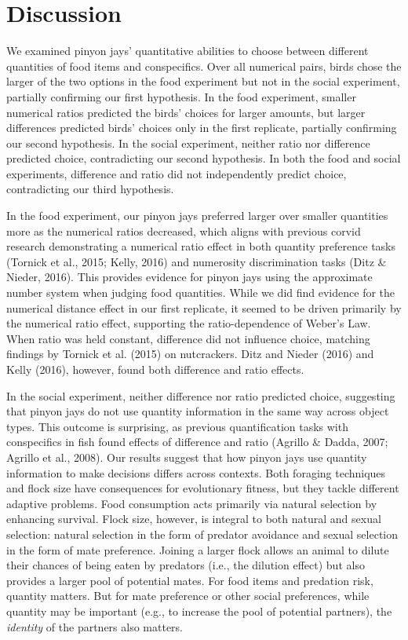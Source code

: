 \documentclass[
  ,pub,floatsintext]{apa6}
\begin{document}
\hypertarget{discussion}{%
\section{Discussion}\label{discussion}}

We examined pinyon jays' quantitative abilities to choose between different quantities of food items and conspecifics. Over all numerical pairs, birds chose the larger of the two options in the food experiment but not in the social experiment, partially confirming our first hypothesis. In the food experiment, smaller numerical ratios predicted the birds' choices for larger amounts, but larger differences predicted birds' choices only in the first replicate, partially confirming our second hypothesis. In the social experiment, neither ratio nor difference predicted choice, contradicting our second hypothesis. In both the food and social experiments, difference and ratio did not independently predict choice, contradicting our third hypothesis.

In the food experiment, our pinyon jays preferred larger over smaller quantities more as the numerical ratios decreased, which aligns with previous corvid research demonstrating a numerical ratio effect in both quantity preference tasks (Tornick et al., 2015; Kelly, 2016) and numerosity discrimination tasks (Ditz \& Nieder, 2016). This provides evidence for pinyon jays using the approximate number system when judging food quantities. While we did find evidence for the numerical distance effect in our first replicate, it seemed to be driven primarily by the numerical ratio effect, supporting the ratio-dependence of Weber's Law. When ratio was held constant, difference did not influence choice, matching findings by Tornick et al. (2015) on nutcrackers. Ditz and Nieder (2016) and Kelly (2016), however, found both difference and ratio effects.

In the social experiment, neither difference nor ratio predicted choice, suggesting that pinyon jays do not use quantity information in the same way across object types. This outcome is surprising, as previous quantification tasks with conspecifics in fish found effects of difference and ratio (Agrillo \& Dadda, 2007; Agrillo et al., 2008). Our results suggest that how pinyon jays use quantity information to make decisions differs across contexts. Both foraging techniques and flock size have consequences for evolutionary fitness, but they tackle different adaptive problems. Food consumption acts primarily via natural selection by enhancing survival. Flock size, however, is integral to both natural and sexual selection: natural selection in the form of predator avoidance and sexual selection in the form of mate preference. Joining a larger flock allows an animal to dilute their chances of being eaten by predators (i.e., the dilution effect) but also provides a larger pool of potential mates. For food items and predation risk, quantity matters. But for mate preference or other social preferences, while quantity may be important (e.g., to increase the pool of potential partners), the \emph{identity} of the partners also matters.
\end{document}
